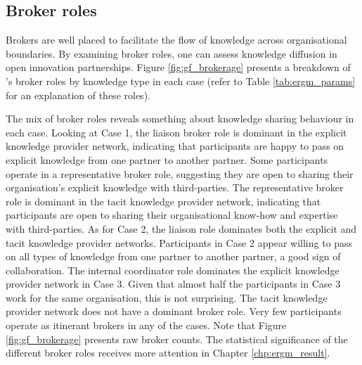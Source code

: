 \subsection{Broker roles}

Brokers are well placed to facilitate the flow of knowledge across organisational boundaries. By examining broker roles, one can assess knowledge diffusion in open innovation partnerships. Figure \ref{fig:gf_brokerage} presents a breakdown of \citeauthor{gould1989structures}'s \citeyearpar{gould1989structures} broker roles by knowledge type in each case (refer to Table \ref{tab:ergm_params} for an explanation of these roles).  \medskip

The mix of broker roles reveals something about knowledge sharing behaviour in each case. Looking at Case 1, the liaison broker role is dominant in the explicit knowledge provider network, indicating that participants are happy to pass on explicit knowledge from one partner to another partner. Some participants operate in a representative broker role, suggesting they are open to sharing their organisation's explicit knowledge with third-parties. The representative broker role is dominant in the tacit knowledge provider network, indicating that participants are open to sharing their organisational know-how and expertise with third-parties. As for Case 2, the liaison role dominates both the explicit and tacit knowledge provider networks. Participants in Case 2 appear willing to pass on all types of knowledge from one partner to another partner, a good sign of collaboration. The internal coordinator role dominates the explicit knowledge provider network in Case 3. Given that almost half the participants in Case 3 work for the same organisation, this is not surprising. The tacit knowledge provider network does not have a dominant broker role. Very few participants operate as itinerant brokers in any of the cases. Note that Figure \ref{fig:gf_brokerage} presents raw broker counts. The statistical significance of the different broker roles receives more attention in Chapter \ref{chp:ergm_result}. \medskip


